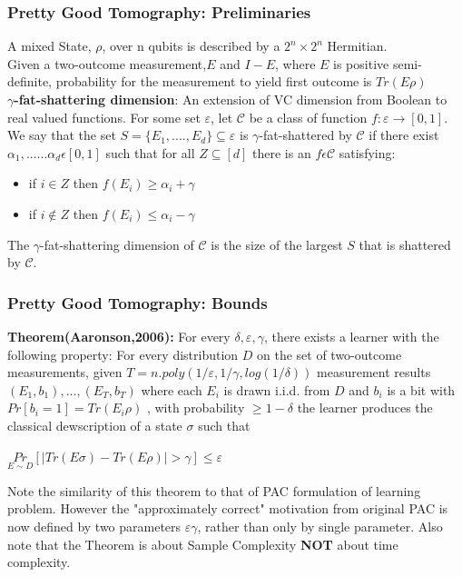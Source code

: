 \documentclass{beamer}
\begin{document}
\begin{frame}
\frametitle{Pretty Good Tomography: Preliminaries}
A mixed State, $\rho$, over n qubits is described by a $2^{n} \times 2^{n}$ Hermitian.
\smallskip\\ Given a two-outcome measurement,$E$ and $I-E$, where $E$ is positive semi-definite, probability for the measurement to yield first outcome is $Tr(E\rho)$
\smallskip\\
\textbf{$\gamma$-fat-shattering dimension}: An extension of VC dimension from Boolean to real valued functions. For some set $\varepsilon$, let $\mathcal{C}$ be a class of function $f: \varepsilon \rightarrow [0,1]$. We say that the set $S = \{E_1,....,E_d\} \subseteq \varepsilon$ is $\gamma$-fat-shattered by $\mathcal{C}$ if there exist $\alpha_1,......\alpha_d  \epsilon  [0,1]$ such that for all $Z \subseteq [d]$ there is an $f \epsilon \mathcal{C}$ satisfying:

\begin{itemize}
\item if $i \in Z$ then $f(E_i)\geq \alpha_i + \gamma$
\item if $i \not\in Z$ then $f(E_i)\leq \alpha_i - \gamma$
\end{itemize}

The $\gamma$-fat-shattering dimension of $\mathcal{C}$ is the size of the largest $S$ that is shattered by $\mathcal{C}$. 
\end{frame}

\begin{frame}
\frametitle{Pretty Good Tomography: Bounds}

\textbf{Theorem(Aaronson,2006):} For every $\delta,\varepsilon,\gamma$, there exists a learner with the following property: For every distribution $D$ on the set of two-outcome measurements, given $T = n.poly(1/\varepsilon,1/\gamma, log(1/\delta) )$ measurement results $(E_1,b_1),...,(E_T,b_T)$ where each $E_i$ is drawn i.i.d. from $D$ and $b_i$ is a bit with $Pr[b_i = 1] = Tr(E_i\rho)$ , with probability $\geq 1 - \delta$ the learner produces the classical dewscription of a state $\sigma$ such that \begin{center}
$\underset{ E \sim  D }{Pr} [| {Tr}(E\sigma) - {Tr}(E\rho)| > \gamma ] \leq \varepsilon   $

\end{center}
Note the similarity of this theorem to that of PAC formulation of learning problem. However the "approximately correct" motivation from original PAC is now defined by two parameters $\varepsilon \gamma$, rather than only by single parameter.
Also note that the Theorem is about Sample Complexity \textbf{NOT} about time complexity.

\end{frame}
\end{document}
